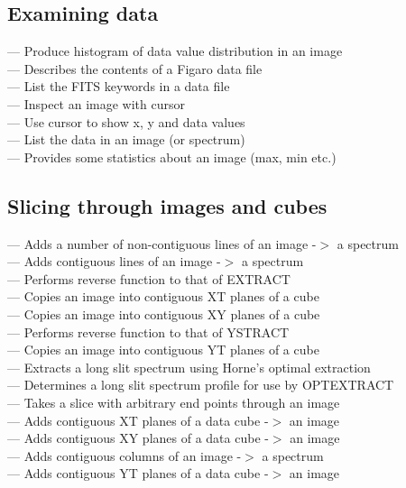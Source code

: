
\subsection{\label{classifexamin}Examining data}

 --- Produce histogram of data value distribution in an image\\
 --- Describes the contents of a Figaro data file\\
 --- List the FITS keywords in a data file\\
 --- Inspect an image with cursor\\
 --- Use cursor to show x, y and data values\\
 --- List the data in an image (or spectrum)\\
 --- Provides some statistics about an image (max, min etc.)


\subsection{\label{classifslices}Slicing through images and cubes}

 --- Adds a number of non-contiguous lines of an image -$>$ a spectrum\\
 --- Adds contiguous lines of an image -$>$ a spectrum\\
 --- Performs reverse function to that of EXTRACT\\
 --- Copies an image into contiguous XT planes of a cube\\
 --- Copies an image into contiguous XY planes of a cube\\
 --- Performs reverse function to that of YSTRACT\\
 --- Copies an image into contiguous YT planes of a cube\\
 --- Extracts a long slit spectrum using Horne's optimal extraction\\
 --- Determines a long slit spectrum profile for use by OPTEXTRACT\\
 --- Takes a slice with arbitrary end points through an image\\
 --- Adds contiguous XT planes of a data cube -$>$ an image\\
 --- Adds contiguous XY planes of a data cube -$>$ an image\\
 --- Adds contiguous columns of an image -$>$ a spectrum\\
 --- Adds contiguous YT planes of a data cube -$>$ an image

